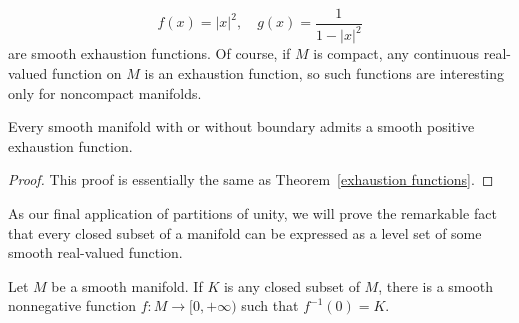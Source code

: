 \[f(x)=|x|^2,\quad g(x)=\frac{1}{1-|x|^2}\]
are smooth exhaustion functions. Of course, if $M$ is compact, any continuous real-valued function on $M$ is an exhaustion function, so such functions are interesting only for noncompact manifolds.
\begin{proposition}
Every smooth manifold with or without boundary admits a smooth positive exhaustion function.
\end{proposition}
\begin{proof}
This proof is essentially the same as Theorem~\ref{exhaustion functions}.
\end{proof}
As our final application of partitions of unity, we will prove the remarkable fact that every closed subset of a manifold can be expressed as a level set of some smooth real-valued function.
\begin{proposition}\label{level set smooth functions}
Let $M$ be a smooth manifold. If $K$ is any closed subset of $M$, there is a smooth nonnegative function $f:M\to[0,+\infty)$ such that $f^{-1}(0)=K$.
\end{proposition}
